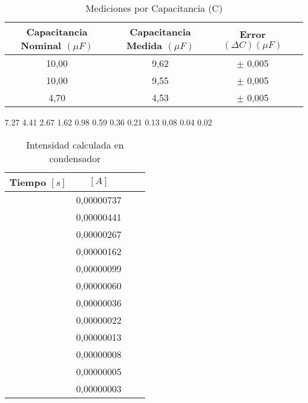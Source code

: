 \documentclass{article}
\begin{document}
\begin{table}[h!]
    \centering
    \begin{tabular}{|c|c|c|c|}
        \hline
       Capacitancia Nominal $(\mu F)$ & Capacitancia Medida $(\mu F)$ & Error $(\Delta C) (\mu F)$ \\ \hline
       10,00 & 9,62 & $\pm$ 0,005 \\ 
       10,00 & 9,55 & $\pm$ 0,005 \\
       4,70 & 4,53 & $\pm$ 0,005 \\ \hline
    \end{tabular}
    \caption{Mediciones por Capacitancia (C)}
    \label{tab:my_label}
\end{table}
7.27
4.41
2.67
1.62
0.98
0.59
0.36
0.21
0.13
0.08
0.04
0.02


\begin{table}
    \centering
    \begin{tabular}{|c|c|c|c|}
            \hline
        Tiempo $[s]$ & $[A]$ \\ \hline  
        [0, 5]	& 0,00000737 \\ \hline 
        [5, 10]	& 0,00000441 \\ \hline 
        [10, 15] & 0,00000267 \\ \hline 
        [15, 20] & 0,00000162 \\ \hline 
        [20, 25] & 0,00000099 \\ \hline 
        [25, 30] & 0,00000060 \\ \hline 
        [30, 35] & 0,00000036 \\ \hline 
        [35, 40] & 0,00000022 \\ \hline 
        [40, 45] & 0,00000013 \\ \hline 
        [45, 50] & 0,00000008 \\ \hline 
        [50, 55] & 0,00000005 \\ \hline 
        [55, 60] & 0,00000003 \\ \hline 
    \end{tabular}
    \caption{Intensidad calculada en condensador}
    \label{tab:my_label}
\end{table}
\end{document}
